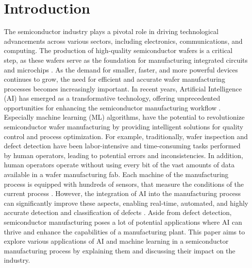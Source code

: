 \documentclass{Academic}
\begin{document}
    \myabstract{}
    \renewcommand{\myTitle}{WIP: Machine Learning Applications in Silicon / Wafer Manufacturing}
    \renewcommand{\MyAuthor}{Leon Knorr}
    \renewcommand{\MyDepartment}{Mannheim Master of Datascience}
    \renewcommand{\ID}{1902854}
    \renewcommand{\Keywords}{Manufacturing, AI, Silicon, Waver}
    \maketitle


    \section{Introduction}
    The semiconductor industry plays a pivotal role in driving technological advancements across various sectors, including electronics, communications, and computing. The production of high-quality semiconductor wafers is a critical step, as these wafers serve as the foundation for manufacturing integrated circuits and microchips \cite{batool_systematic_2021}. As the demand for smaller, faster, and more powerful devices continues to grow, the need for efficient and accurate wafer manufacturing processes becomes increasingly important. In recent years, Artificial Intelligence (AI) has emerged as a transformative technology, offering unprecedented opportunities for enhancing the semiconductor manufacturing workflow \cite{batool_systematic_2021,susto_automatic_2012}.
    Especially machine learning (ML) algorithms, have the potential to revolutionize semiconductor wafer manufacturing by providing intelligent solutions for quality control and process optimization. For example, traditionally, wafer inspection and defect detection have been labor-intensive and time-consuming tasks performed by human operators, leading to potential errors and inconsistencies. In addition, human operators operate without using every bit of the vast amounts of data available in a wafer manufacturing fab. Each machine of the manufacturing process is equipped with hundreds of sensors, that measure the conditions of the current process \cite{kim_machine_2012}. However, the integration of AI into the manufacturing process can significantly improve these aspects, enabling real-time, automated, and highly accurate detection and classification of defects \cite{yuan-fu_deep_2019-1}. Aside from defect detection, semiconductor manufacturing poses a lot of potential applications where AI can thrive and enhance the capabilities of a manufacturing plant. This paper aims to explore various applications of AI and machine learning in a semiconductor manufacturing process by explaining them and discussing their impact on the industry.
\end{document}

